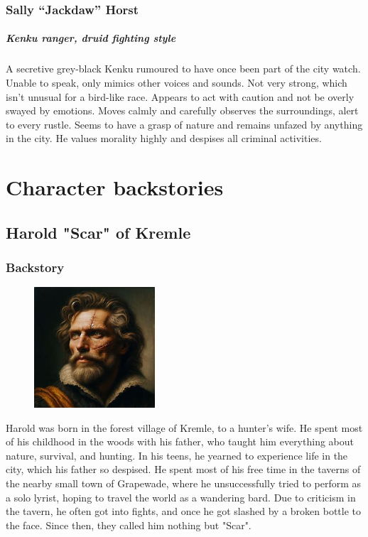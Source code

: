 \documentclass[10pt,onecolumn,twoside,openany,bg=full,layout=true]{dndbook}
\begin{document}
  \subsection{Sally “Jackdaw” Horst}\label{subsec:sally-jackdaw-horst}
  \paragraph{Kenku ranger, druid fighting style}
  A secretive grey-black Kenku rumoured to have once been part of the city watch.
  Unable to speak, only mimics other voices and sounds.
  Not very strong, which isn't unusual for a bird-like race.
  Appears to act with caution and not be overly swayed by emotions.
  Moves calmly and carefully observes the surroundings, alert to every rustle.
  Seems to have a grasp of nature and remains unfazed by anything in the city.
  He values morality highly and despises all criminal activities.

\vfill

\chapter{Character backstories}\label{ch:character-backstories}
\section{Harold "Scar" of Kremle}\label{sec:harold-"scar"-of-kremle}
\subsection{Backstory}\label{subsec:harold-backstory}
\begin{figure}
  \begin{center}
    \includegraphics[width=0.4\textwidth]{img/characters/harold}
  \end{center}
\end{figure}
Harold was born in the forest village of Kremle, to a hunter's wife.
He spent most of his childhood in the woods with his father, who taught him everything about nature, survival, and hunting.
In his teens, he yearned to experience life in the city, which his father so despised.
He spent most of his free time in the taverns of the nearby small town of Grapewade,
where he unsuccessfully tried to perform as a solo lyrist, hoping to travel the world as a wandering bard.
Due to criticism in the tavern, he often got into fights, and once he got slashed by a broken bottle to the face.
Since then, they called him nothing but "Scar".
\end{document}
